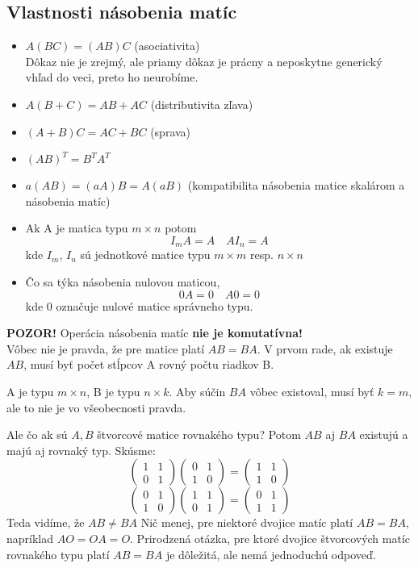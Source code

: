 \subsection*{Vlastnosti násobenia matíc}
\begin{itemize}
    \item $A(BC) = (AB)C$ (asociativita) \\
    Dôkaz nie je zrejmý, ale priamy dôkaz je prácny a neposkytne generický vhľad do veci, preto ho neurobíme.
    
    \item $A(B + C) = AB + AC$ (distributivita zľava)
    \item $(A + B) C = AC + BC$ (sprava)
    \item $(AB)^T = B^T A^T$
    \item $a(AB) = (aA) B = A (aB)$ (kompatibilita násobenia matice skalárom a násobenia
    matíc)
    \item Ak A je matica typu $m \times n$ potom 
    \[
    I_m A = A \quad A I_n = A
    \]
    kde $I_m$, $I_n$ sú jednotkové matice typu $m \times m$ resp. $n \times n$
    \item Čo sa týka násobenia nulovou maticou,
    \[
    0A = 0\quad A0 = 0
    \]
    kde $0$ označuje nulové matice správneho typu.
\end{itemize}

\textbf{POZOR!} Operácia násobenia matíc \textbf{nie je komutatívna!} \\
Vôbec nie je pravda, že pre matice platí $AB = BA$.
V prvom rade, ak existuje $AB$, musí byť počet stĺpcov A rovný počtu riadkov B.

A je typu $m \times n$, B je typu $n \times k$.
Aby súčin $BA$ vôbec existoval, musí byť $k = m$, ale to nie je vo všeobecnosti pravda.

Ale čo ak sú $A,B$ štvorcové matice rovnakého typu? Potom $AB$ aj $BA$ existujú a majú aj rovnaký typ.
Skúsme:
\[ \begin{pmatrix} 1 & 1 \\ 0 & 1 \end{pmatrix} \begin{pmatrix} 0 & 1 \\ 1 & 0 \end{pmatrix} = \begin{pmatrix} 1 & 1 \\ 1 & 0 \end{pmatrix} \]
\[ \begin{pmatrix} 0 & 1 \\ 1 & 0 \end{pmatrix} \begin{pmatrix} 1 & 1 \\ 0 & 1 \end{pmatrix} = \begin{pmatrix} 0 & 1 \\ 1 & 1 \end{pmatrix} \]
Teda vidíme, že $AB\neq BA$
Nič menej, pre niektoré dvojice matíc platí $AB = BA$, napríklad $A O = O A = O$.
Prirodzená otázka, pre ktoré dvojice štvorcových matíc rovnakého typu platí $AB = BA$
je dôležitá, ale nemá jednoduchú odpoveď.

